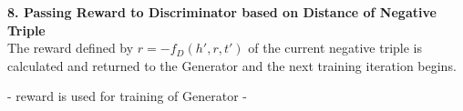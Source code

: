 \textbf{8. Passing Reward to Discriminator based on Distance of Negative Triple}\\
The reward defined by $r = - f_D(h',r,t')$ of the current negative triple is calculated and returned to the Generator and the next training iteration begins.

- reward is used for training of Generator
- 